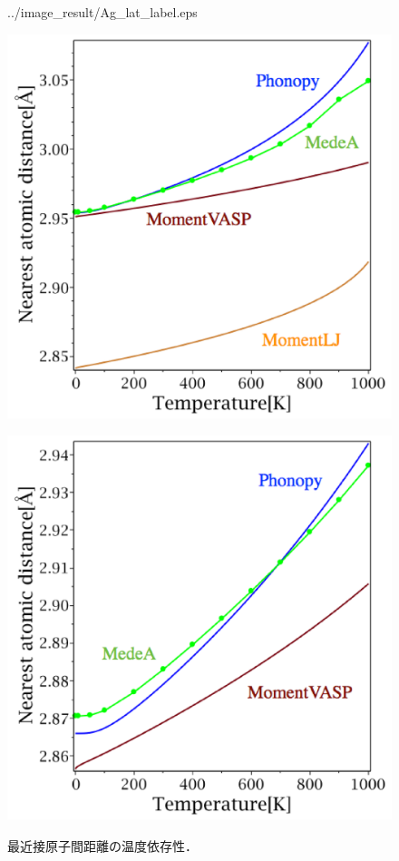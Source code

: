 \begin{figure}[htbp]
\begin{minipage}[b]{0.5\linewidth}
  {../image_result/Ag_lat_label.eps}
  \label{he2}
 \end{minipage}
 \hspace{10cm}
 \begin{minipage}[b]{0.5\linewidth}
  \centering
  \includegraphics[keepaspectratio, scale=0.42]
  {../image_result/Au_lat_label.eps}
  \label{he3}
 \end{minipage}
 \begin{minipage}[b]{0.5\linewidth}
  \centering
  \includegraphics[keepaspectratio, scale=0.42]
  {../image_result/Al_lat_label.eps}
  \label{he4}
 \end{minipage}
 \caption{最近接原子間距離の温度依存性．}\label{fig:heatexpantion}
\end{figure}

